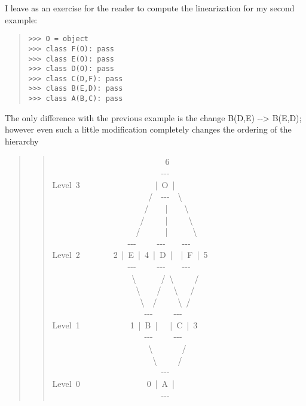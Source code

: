 \documentclass[10pt,a4paper,english]{article}
\begin{document}
I leave as an exercise for the reader to compute the linearization for
my second example:
\begin{quote}
\begin{verbatim}>>> O = object
>>> class F(O): pass
>>> class E(O): pass
>>> class D(O): pass
>>> class C(D,F): pass
>>> class B(E,D): pass
>>> class A(B,C): pass\end{verbatim}
\end{quote}

The only difference with the previous example is the change B(D,E) -{}-{\textgreater}
B(E,D); however even such a little modification completely changes the
ordering of the hierarchy
\begin{quote}
\begin{quote}{\ttfamily \raggedright \noindent
~~~~~~~~~~~~~~~~~~~~~~~~~~~6~\\
~~~~~~~~~~~~~~~~~~~~~~~~~~-{}-{}-~\\
Level~3~~~~~~~~~~~~~~~~~~|~O~|~\\
~~~~~~~~~~~~~~~~~~~~~~~/~~-{}-{}-~~{\textbackslash}~\\
~~~~~~~~~~~~~~~~~~~~~~/~~~~|~~~~{\textbackslash}~\\
~~~~~~~~~~~~~~~~~~~~~/~~~~~|~~~~~{\textbackslash}~\\
~~~~~~~~~~~~~~~~~~~~/~~~~~~|~~~~~~{\textbackslash}~\\
~~~~~~~~~~~~~~~~~~-{}-{}-~~~~~-{}-{}-~~~~-{}-{}-~\\
Level~2~~~~~~~~2~|~E~|~4~|~D~|~~|~F~|~5~\\
~~~~~~~~~~~~~~~~~~-{}-{}-~~~~~-{}-{}-~~~~-{}-{}-~\\
~~~~~~~~~~~~~~~~~~~{\textbackslash}~~~~~~/~{\textbackslash}~~~~~/~\\
~~~~~~~~~~~~~~~~~~~~{\textbackslash}~~~~/~~~{\textbackslash}~~~/~\\
~~~~~~~~~~~~~~~~~~~~~{\textbackslash}~~/~~~~~{\textbackslash}~/~\\
~~~~~~~~~~~~~~~~~~~~~~-{}-{}-~~~~~-{}-{}-~\\
Level~1~~~~~~~~~~~~1~|~B~|~~~|~C~|~3~\\
~~~~~~~~~~~~~~~~~~~~~~-{}-{}-~~~~~-{}-{}-~\\
~~~~~~~~~~~~~~~~~~~~~~~{\textbackslash}~~~~~~~/~\\
~~~~~~~~~~~~~~~~~~~~~~~~{\textbackslash}~~~~~/~\\
~~~~~~~~~~~~~~~~~~~~~~~~~~-{}-{}-~\\
Level~0~~~~~~~~~~~~~~~~0~|~A~|~\\
~~~~~~~~~~~~~~~~~~~~~~~~~~-{}-{}-
}\end{quote}
\end{quote}
\end{document}

